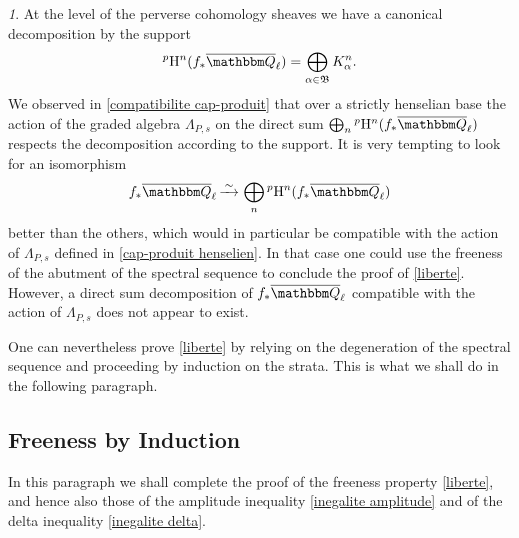 \documentclass[12pt,english]{smfart}
\numberwithin{equation}{subsection}
\theoremstyle{remark}
\newtheorem{numero}[equation]{}
\newcommand\FrakB{{\mathfrak B}}
\newcommand\QQ{{\mathbbm Q}}
\newcommand\rmH{{\rm H}}
\newcommand\isom{\,\smash{\mathop{\hbox to 5mm{\rightarrowfill}}
    \limits^\sim}\,}
\newcommand\Ql{{\overline\QQ_\ell}}
\begin{document}
\begin{numero}\label{pas de decomposition compatible}
At the level of the perverse cohomology sheaves we have a canonical decomposition by the support
$${}^p\rmH^n(f_*\Ql)=\bigoplus_{\alpha\in\FrakB} K^n_\alpha.$$
We observed in \ref{compatibilite cap-produit} that over a strictly henselian base the action of the graded algebra $\Lambda_{P,s}$ on the direct sum $\bigoplus_n {}^p\rmH^n(f_*\Ql)$ respects the decomposition according to the support. It is very tempting to look for an isomorphism
$$f_*\Ql \isom \bigoplus_n {}^p\rmH^n(f_*\Ql)$$
better than the others, which would in particular be compatible with the action of $\Lambda_{P,s}$ defined in \ref{cap-produit henselien}. In that case one could use the freeness of the abutment of the spectral sequence to conclude the proof of \ref{liberte}. However, a direct sum decomposition of $f_*\Ql$ compatible with the action of $\Lambda_{P,s}$ does not appear to exist.

One can nevertheless prove \ref{liberte} by relying on the degeneration of the spectral sequence and proceeding by induction on the strata. This is what we shall do in the following paragraph.
\end{numero}

\subsection{Freeness by Induction}\label{subsection : liberte recurrence}

In this paragraph we shall complete the proof of the freeness property \ref{liberte}, and hence also those of the amplitude inequality \ref{inegalite amplitude} and of the delta inequality \ref{inegalite delta}.
\end{document}
